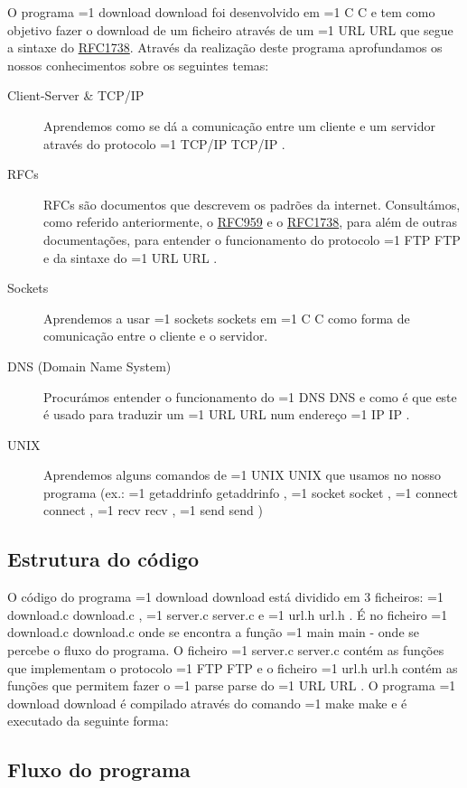 \documentclass[11pt,a4paper,twocolumn]{article}
\newcommand{\hl}[2][1]{%
  \ifnum#1=1\relax
    \textcolor{text-hl1}{#2}%
  \else
    \textcolor{text-hl2}{#2}%
  \fi
}
\begin{document}
O programa \hl{download} foi desenvolvido em \hl{C} e tem como objetivo fazer o download de um ficheiro através de um \hl{URL} que segue a sintaxe do \href{https://datatracker.ietf.org/doc/html/rfc1738}{RFC1738}.
Através da realização deste programa aprofundamos os nossos conhecimentos sobre os seguintes temas:
\begin{description}
    \item[Client-Server \& TCP/IP] Aprendemos como se dá a comunicação entre um cliente e um servidor através do protocolo \hl{TCP/IP}.
    \item[RFCs] RFCs são documentos que descrevem os padrões da internet. Consultámos, como referido anteriormente, o \href{https://datatracker.ietf.org/doc/html/rfc959}{RFC959} e o \href{https://datatracker.ietf.org/doc/html/rfc1738}{RFC1738}, para além de outras documentações, para entender o funcionamento do protocolo \hl{FTP} e da sintaxe do \hl{URL}.
    \item[Sockets] Aprendemos a usar \hl{sockets} em \hl{C} como forma de comunicação entre o cliente e o servidor.
    \item[DNS (Domain Name System)] Procurámos entender o funcionamento do \hl{DNS} e como é que este é usado para traduzir um \hl{URL} num endereço \hl{IP}.
    \item[UNIX] Aprendemos alguns comandos de \hl{UNIX} que usamos no nosso programa (ex.: \hl[2]{getaddrinfo}, \hl[2]{socket}, \hl[2]{connect}, \hl[2]{recv}, \hl[2]{send})
\end{description}

\subsection{Estrutura do código}

O código do programa \hl{download} está dividido em 3 ficheiros: \hl{download.c}, \hl{server.c} e \hl{url.h}.
É no ficheiro \hl{download.c} onde se encontra a função \hl{main} - onde se percebe o fluxo do programa. O ficheiro \hl{server.c} contém as funções que implementam o protocolo \hl{FTP} e o ficheiro \hl{url.h} contém as funções que permitem fazer o \hl{parse} do \hl{URL}.
O programa \hl{download} é compilado através do comando \hl{make} e é executado da seguinte forma:

\subsection{Fluxo do programa}
\end{document}
